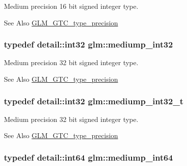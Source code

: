 Medium precision 16 bit signed integer type. \begin{DoxySeeAlso}{See Also}
\hyperlink{group__gtc__type__precision}{G\-L\-M\-\_\-\-G\-T\-C\-\_\-type\-\_\-precision} 
\end{DoxySeeAlso}
\hypertarget{group__gtc__type__precision_ga0660a752402702f420f13c686a7fff29}{
\subsubsection[{mediump\-\_\-int32}]{\setlength{\rightskip}{0pt plus 5cm}typedef detail\-::int32 {\bf glm\-::mediump\-\_\-int32}}}\label{group__gtc__type__precision_ga0660a752402702f420f13c686a7fff29}
Medium precision 32 bit signed integer type. \begin{DoxySeeAlso}{See Also}
\hyperlink{group__gtc__type__precision}{G\-L\-M\-\_\-\-G\-T\-C\-\_\-type\-\_\-precision} 
\end{DoxySeeAlso}
\hypertarget{group__gtc__type__precision_gafd9b4bd9e4465aec63351b59100692c4}{
\subsubsection[{mediump\-\_\-int32\-\_\-t}]{\setlength{\rightskip}{0pt plus 5cm}typedef detail\-::int32 {\bf glm\-::mediump\-\_\-int32\-\_\-t}}}\label{group__gtc__type__precision_gafd9b4bd9e4465aec63351b59100692c4}
Medium precision 32 bit signed integer type. \begin{DoxySeeAlso}{See Also}
\hyperlink{group__gtc__type__precision}{G\-L\-M\-\_\-\-G\-T\-C\-\_\-type\-\_\-precision} 
\end{DoxySeeAlso}
\hypertarget{group__gtc__type__precision_ga603c695fe5cd677d3f72a81343e19a74}{
\subsubsection[{mediump\-\_\-int64}]{\setlength{\rightskip}{0pt plus 5cm}typedef detail\-::int64 {\bf glm\-::mediump\-\_\-int64}}}\label{group__gtc__type__precision_ga603c695fe5cd677d3f72a81343e19a74}
